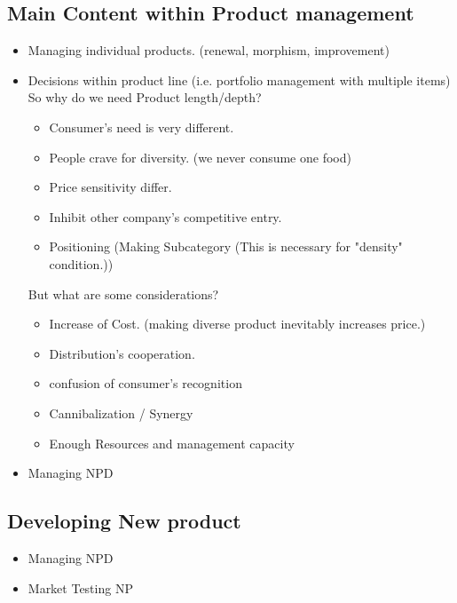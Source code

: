 \documentclass[12pt]{article}
\begin{document}
\subsection{Main Content within Product management}
\begin{itemize}
	\item Managing individual products.  (renewal, morphism, improvement)
	\item Decisions within product line (i.e. portfolio management with multiple items) \\
	So why do we need  Product length/depth?
	\begin{itemize}
		\item Consumer's need is very different.
		\item People crave for diversity. (we never consume one food)
		\item Price sensitivity differ.
		\item Inhibit other company's competitive entry.
		\item Positioning (Making Subcategory (This is necessary for "density" condition.))
	\end{itemize}

	But what are some considerations?

	\begin{itemize}
		\item Increase of Cost. (making diverse product inevitably increases price.)
		\item Distribution's cooperation.
		\item confusion of consumer's recognition
		\item Cannibalization / Synergy
		\item Enough Resources and management capacity
	\end{itemize}

	\item Managing NPD
\end{itemize}

\subsection{Developing New product}
\begin{itemize}
	\item Managing NPD
	\item Market Testing NP
\end{itemize}
\end{document}
